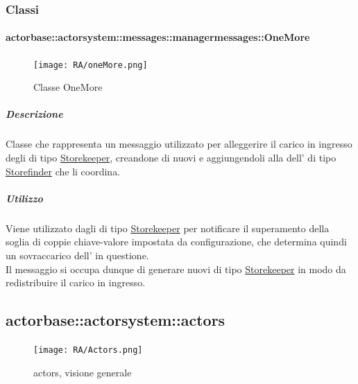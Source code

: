 \documentclass{scalatekids-article}
\begin{document}
\subsubsection{Classi}

\paragraph{actorbase::actorsystem::messages::managermessages::OneMore}

\begin{figure}[H]
  \begin{center}
    \texttt{[image: RA/oneMore.png]}
    \caption{Classe OneMore}
  \end{center}
\end{figure}

\subparagraph{Descrizione}
Classe che rappresenta un messaggio utilizzato per alleggerire il carico in
ingresso degli  di tipo
\hyperref[sec:actorbase::actorsystem::actors::storekeeper::Storekeeper]{Storekeeper},
creandone di nuovi e aggiungendoli alla  dell' di tipo
\hyperref[sec:actorbase::actorsystem::actors::storefinder::Storefinder]{Storefinder}
che li coordina.

\subparagraph{Utilizzo}
Viene utilizzato dagli  di tipo
\hyperref[sec:actorbase::actorsystem::actors::Storekeeper]{Storekeeper} per
notificare il superamento della soglia di coppie chiave-valore impostata da
configurazione, che determina quindi un sovraccarico dell' in
questione.\\ Il messaggio si occupa dunque di generare nuovi  di
tipo
\hyperref[sec:actorbase::actorsystem::actors::storekeeper::Storekeeper]{Storekeeper}
in modo da redistribuire il carico in ingresso.


\subsection{actorbase::actorsystem::actors} %
\label{sec:actorbase::actorsystem::actors}

\begin{figure}[H]
  \begin{center}
    \texttt{[image: RA/Actors.png]}
    \caption{ actors, visione generale}
  \end{center}
\end{figure}
\end{document}
